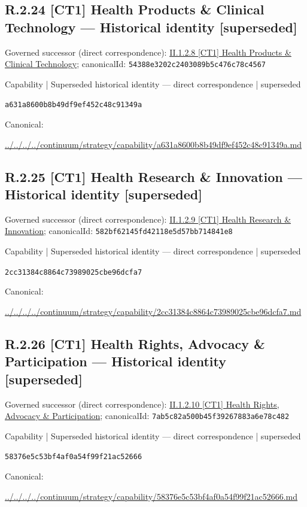 \documentclass[10pt,a4paper]{article}
\begin{document}
\subsection*{R.2.24 [CT1] Health Products \& Clinical Technology — Historical identity [superseded]}
Governed successor (direct correspondence): \hyperref[element-54388e3202c2403089b5c476c78c4567]{II.1.2.8 [CT1] Health Products \& Clinical Technology}; canonicalId: \texttt{54388e3202c2403089b5c476c78c4567}\par
\label{element-a631a8600b8b49df9ef452c48c91349a}
{\small Capability | Superseded historical identity — direct correspondence | superseded}\par
\texttt{a631a8600b8b49df9ef452c48c91349a}\par
Canonical: \par
{\footnotesize\url{../../../../continuum/strategy/capability/a631a8600b8b49df9ef452c48c91349a.md}}\par
\subsection*{R.2.25 [CT1] Health Research \& Innovation — Historical identity [superseded]}
Governed successor (direct correspondence): \hyperref[element-582bf62145fd42118e5d57bb714841e8]{II.1.2.9 [CT1] Health Research \& Innovation}; canonicalId: \texttt{582bf62145fd42118e5d57bb714841e8}\par
\label{element-2cc31384c8864c73989025cbe96dcfa7}
{\small Capability | Superseded historical identity — direct correspondence | superseded}\par
\texttt{2cc31384c8864c73989025cbe96dcfa7}\par
Canonical: \par
{\footnotesize\url{../../../../continuum/strategy/capability/2cc31384c8864c73989025cbe96dcfa7.md}}\par
\subsection*{R.2.26 [CT1] Health Rights, Advocacy \& Participation — Historical identity [superseded]}
Governed successor (direct correspondence): \hyperref[element-7ab5c82a500b45f39267883a6e78c482]{II.1.2.10 [CT1] Health Rights, Advocacy \& Participation}; canonicalId: \texttt{7ab5c82a500b45f39267883a6e78c482}\par
\label{element-58376e5c53bf4af0a54f99f21ac52666}
{\small Capability | Superseded historical identity — direct correspondence | superseded}\par
\texttt{58376e5c53bf4af0a54f99f21ac52666}\par
Canonical: \par
{\footnotesize\url{../../../../continuum/strategy/capability/58376e5c53bf4af0a54f99f21ac52666.md}}\par
\end{document}
